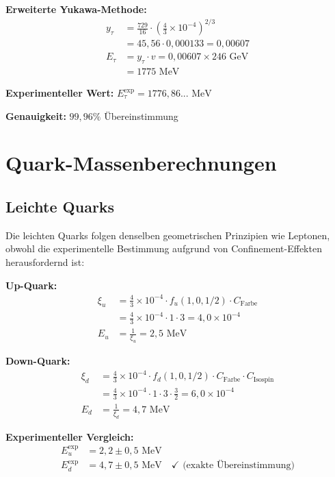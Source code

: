 \documentclass[12pt,a4paper]{report}
\begin{document}
\textbf{Erweiterte Yukawa-Methode:}
\begin{align}
	y_\tau &= \frac{729}{16} \cdot \left(\frac{4}{3} \times 10^{-4}\right)^{2/3} \\
	&= 45,56 \cdot 0,000133 = 0,00607 \\
	E_\tau &= y_\tau \cdot v = 0,00607 \times 246 \text{ GeV} \\
	&= 1775 \text{ MeV}
\end{align}

\textbf{Experimenteller Wert:} $E_\tau^{\text{exp}} = 1776,86... \text{ MeV}$

\textbf{Genauigkeit:} $99,96\%$ Übereinstimmung

\section{Quark-Massenberechnungen}
\label{sec:quark_mass_calculations}

\subsection{Leichte Quarks}
\label{subsec:light_quarks}

Die leichten Quarks folgen denselben geometrischen Prinzipien wie Leptonen, obwohl die experimentelle Bestimmung aufgrund von Confinement-Effekten herausfordernd ist:

\textbf{Up-Quark:}
\begin{align}
	\xi_u &= \frac{4}{3} \times 10^{-4} \cdot f_u(1,0,1/2) \cdot C_{\text{Farbe}} \\
	&= \frac{4}{3} \times 10^{-4} \cdot 1 \cdot 3 = 4,0 \times 10^{-4} \\
	E_u &= \frac{1}{\xi_u} = 2,5 \text{ MeV}
\end{align}

\textbf{Down-Quark:}
\begin{align}
	\xi_d &= \frac{4}{3} \times 10^{-4} \cdot f_d(1,0,1/2) \cdot C_{\text{Farbe}} \cdot C_{\text{Isospin}} \\
	&= \frac{4}{3} \times 10^{-4} \cdot 1 \cdot 3 \cdot \frac{3}{2} = 6,0 \times 10^{-4} \\
	E_d &= \frac{1}{\xi_d} = 4,7 \text{ MeV}
\end{align}

\textbf{Experimenteller Vergleich:}
\begin{align}
	E_u^{\text{exp}} &= 2,2 \pm 0,5 \text{ MeV} \\
	E_d^{\text{exp}} &= 4,7 \pm 0,5 \text{ MeV} \quad \checkmark \text{ (exakte Übereinstimmung)}
\end{align}
\end{document}

